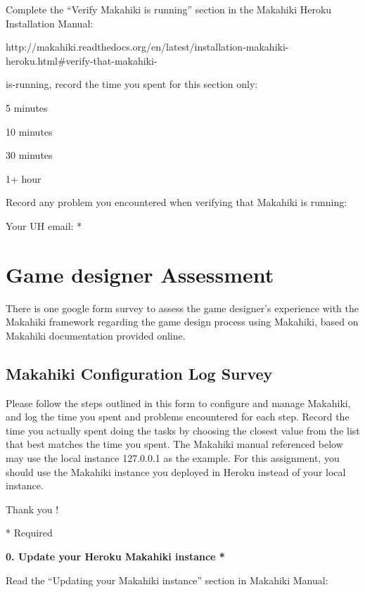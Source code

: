 Complete the ``Verify Makahiki is running'' section in the Makahiki Heroku Installation Manual:

http://makahiki.readthedocs.org/en/latest/installation-makahiki-heroku.html\#verify-that-makahiki-

is-running, record the time you spent for this section only:

\begin{radiobutton}
\item 5 minutes
\item  10 minutes
\item  30 minutes
\item  1+ hour
\end{radiobutton}

Record any problem you encountered when verifying that Makahiki is running: \underline{\hspace{3cm}}

Your UH email: * \underline{\hspace{4cm}}

\section{Game designer Assessment}
\label{app:googleform-design}

There is one google form survey to assess the game designer's experience with the Makahiki framework regarding the game design process using  Makahiki, based on Makahiki documentation provided online.

\subsection{Makahiki Configuration Log Survey}

Please follow the steps outlined in this form to configure and manage Makahiki, and log the time you spent and problems encountered for each step. Record the time you actually spent doing the tasks by choosing the closest value from the list that best matches the time you spent.
The Makahiki manual referenced below may use the local instance 127.0.0.1 as the example. For this assignment, you should use the Makahiki instance you deployed in Heroku instead of your local instance.

Thank you !

* Required

{\bf 0. Update your Heroku Makahiki instance *}

Read the ``Updating your Makahiki instance'' section in Makahiki Manual:

